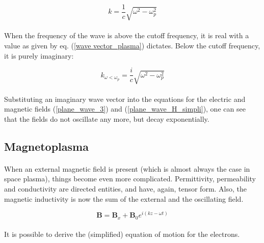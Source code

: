 \documentclass[a4paper,10pt]{thesis}
\begin{document}
\begin{equation}\label{wave vector_plasma}
    k=\frac{1}{c} \sqrt{\omega^2-\omega_p^2 }
\end{equation}

\paragraph*{}
When the frequency of the wave is above the cutoff frequency, it is real with a value as given by eq. (\ref{wave vector_plasma}) dictates. Below the cutoff frequency, it is purely imaginary:

\begin{equation}\label{wave vector_plasma_imag}
    k_{\omega<\omega_p}=\frac{i}{c} \sqrt{\omega^2-\omega_p^2 }
\end{equation}

\paragraph*{}
Substituting an imaginary wave vector into the equations for the electric and magnetic fields (\ref{plane_wave_3}) and (\ref{plane_wave_H_simpli}), one can see that the fields do not oscillate any more, but decay exponentially.

\subsection{Magnetoplasma}
\paragraph*{}
When an external magnetic field is present (which is almost always the case in space plasma), things become even more complicated. Permittivity, permeability and conductivity are directed entities, and have, again, tensor form. Also, the magnetic inductivity is now the sum of the external and the oscillating field.

\begin{equation}\label{B_magnetoplasma}
    \mathbf{B}=\mathbf{B}_x + \mathbf{B}_0 e^{i(kz-\omega t)}
\end{equation}

\paragraph*{}
It is possible to derive the (simplified) equation of motion for the electrons.
\end{document}
